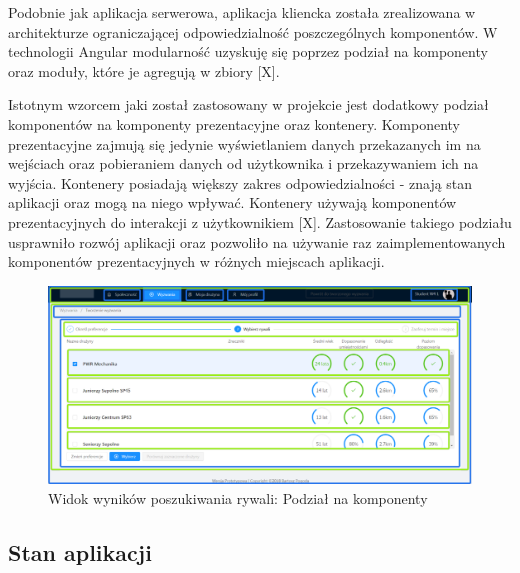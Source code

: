 Podobnie jak aplikacja serwerowa, aplikacja kliencka została zrealizowana w architekturze ograniczającej odpowiedzialność poszczególnych komponentów. W technologii Angular modularność uzyskuję się poprzez podział na komponenty oraz moduły, które je agregują w zbiory [X]. 

Istotnym wzorcem jaki został zastosowany w projekcie jest dodatkowy podział komponentów na komponenty prezentacyjne oraz kontenery. Komponenty prezentacyjne zajmują się jedynie wyświetlaniem danych przekazanych im na wejściach oraz pobieraniem danych od użytkownika i przekazywaniem ich na wyjścia. Kontenery posiadają większy zakres odpowiedzialności - znają stan aplikacji oraz mogą na niego wpływać. Kontenery używają komponentów prezentacyjnych do interakcji z użytkownikiem [X]. Zastosowanie takiego podziału usprawniło rozwój aplikacji oraz pozwoliło na używanie raz zaimplementowanych komponentów prezentacyjnych w różnych miejscach aplikacji.

\begin{figure}[H]
\centering
\includegraphics[width=\linewidth]{06-implementacja/rys/modularyzacja.PNG}
\caption{Widok wyników poszukiwania rywali: Podział na komponenty}
\label{fig:criterion-classes}
\end{figure}


\subsection{Stan aplikacji}

